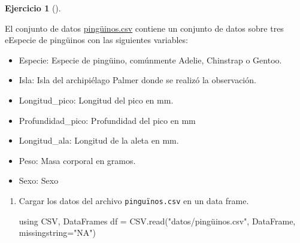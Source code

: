 \documentclass[
  a4paper,
]{scrreport}
\newenvironment{Shaded}{\begin{snugshade}}{\end{snugshade}}
\newcommand{\BuiltInTok}[1]{\textcolor[rgb]{0.00,0.23,0.31}{#1}}
\newcommand{\FunctionTok}[1]{\textcolor[rgb]{0.28,0.35,0.67}{#1}}
\newcommand{\ImportTok}[1]{\textcolor[rgb]{0.00,0.46,0.62}{#1}}
\newcommand{\NormalTok}[1]{\textcolor[rgb]{0.00,0.23,0.31}{#1}}
\newcommand{\OperatorTok}[1]{\textcolor[rgb]{0.37,0.37,0.37}{#1}}
\newcommand{\StringTok}[1]{\textcolor[rgb]{0.13,0.47,0.30}{#1}}
\providecommand{\tightlist}{%
  \setlength{\itemsep}{0pt}\setlength{\parskip}{0pt}}\usepackage{longtable,booktabs,array}
\theoremstyle{definition}
\newtheorem{exercise}{Ejercicio}[chapter]
\theoremstyle{remark}
\begin{document}
\begin{exercise}[]\protect\hypertarget{exr-arboles-decision-2}{}\label{exr-arboles-decision-2}

El conjunto de datos \href{}{pingüinos.csv} contiene un conjunto de
datos sobre tres eEspecie de pingüinos con las siguientes variables:

\begin{itemize}
\tightlist
\item
  Especie: Especie de pingüino, comúnmente Adelie, Chinstrap o Gentoo.
\item
  Isla: Isla del archipiélago Palmer donde se realizó la observación.
\item
  Longitud\_pico: Longitud del pico en mm.
\item
  Profundidad\_pico: Profundidad del pico en mm
\item
  Longitud\_ala: Longitud de la aleta en mm.
\item
  Peso: Masa corporal en gramos.
\item
  Sexo: Sexo
\end{itemize}

\begin{enumerate}
\def\labelenumi{\alph{enumi}.}
\item
  Cargar los datos del archivo \texttt{pinguïnos.csv} en un data frame.

  \begin{tcolorbox}[enhanced jigsaw, toptitle=1mm, breakable, toprule=.15mm, opacitybacktitle=0.6, coltitle=black, titlerule=0mm, arc=.35mm, title=\textcolor{quarto-callout-tip-color}{\faLightbulb}\hspace{0.5em}{Solución}, rightrule=.15mm, opacityback=0, colback=white, bottomrule=.15mm, leftrule=.75mm, colbacktitle=quarto-callout-tip-color!10!white, bottomtitle=1mm, colframe=quarto-callout-tip-color-frame, left=2mm]

\begin{Shaded}
\begin{Highlighting}[]
\ImportTok{using} \BuiltInTok{CSV}\NormalTok{, }\BuiltInTok{DataFrames}
\NormalTok{df }\OperatorTok{=}\NormalTok{ CSV.}\FunctionTok{read}\NormalTok{(}\StringTok{"datos/pingüinos.csv"}\NormalTok{, DataFrame, missingstring}\OperatorTok{=}\StringTok{"NA"}\NormalTok{)}
\end{Highlighting}
\end{Shaded}


\end{tcolorbox}
\end{enumerate}
\end{exercise}
\end{document}
